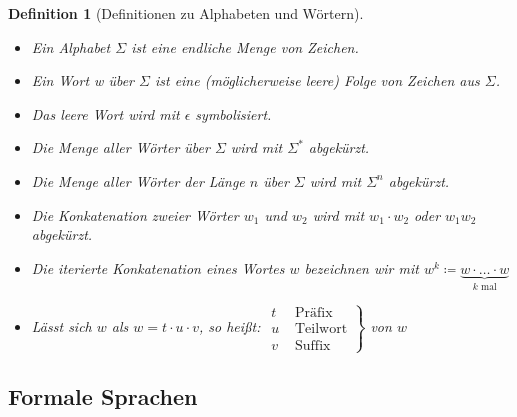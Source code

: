 \documentclass[11pt]{scrartcl}
\theoremstyle{break}
\newtheorem{defi}[satz]{Definition}
\begin{document}
    \begin{defi}[Definitionen zu Alphabeten und Wörtern]
        \begin{itemize}
            \item Ein Alphabet $\Sigma$ ist eine endliche Menge von Zeichen.
            \item Ein Wort w über $\Sigma$ ist eine (möglicherweise leere) Folge von Zeichen aus $\Sigma$.
            \item Das leere Wort wird mit $\epsilon$ symbolisiert.
            \item Die Menge aller Wörter über $\Sigma$ wird mit $\Sigma^*$ abgekürzt.
            \item Die Menge aller Wörter der Länge $n$ über $\Sigma$ wird mit $\Sigma^n$ abgekürzt.
            \item Die Konkatenation zweier Wörter $w_1$ und $w_2$ wird mit $w_1\cdot w_2$ oder $w_{1}w_{2}$ abgekürzt.
            \item Die iterierte Konkatenation eines Wortes $w$ bezeichnen wir mit $w^k\coloneqq \underbrace{w\cdot\dots\cdot w}_{k\text{ mal}}$
            \item Lässt sich $w$ als $w=t\cdot u\cdot v$, so heißt:
            $\left. \begin{array}{cc}
                        t &\text{ Präfix}\\
                        u &\text{ Teilwort}\\
                        v &\text{ Suffix}
            \end{array} \right\}$
            von $w$
        \end{itemize}
    \end{defi}


    \subsection{Formale Sprachen}
	\label{subsec:formale-sprachen}
\end{document}
